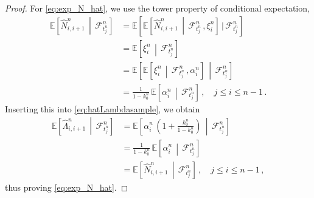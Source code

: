 \documentclass{article}
\newcommand{\1}{\mathbbm{1}}
\numberwithin{equation}{section}
\begin{document}
\begin{proof}
    For \eqref{eq:exp_N_hat}, we use the tower property of conditional expectation,
    \begin{align}
    \label{eq:conditional_exp_N_alpha}
        \mathbb E \left[\widehat N^n_{i,i+1}\,\middle|\,\mathcal F^n_{t^n_j} \right] &= \mathbb E \left[\mathbb E \left[\widehat N^n_{i,i+1}\,\middle|\,\mathcal F^n_{t^n_j}\,, \xi^n_i \right]\,|\,\mathcal F^n_{t^n_j} \right] \nonumber\\
        &= \mathbb E \left[\xi^n_i\,\middle|\,\mathcal F^n_{t^n_j}\right] \nonumber\\
        &= \mathbb E \left[ \mathbb E \left[ \xi^n_i\,\middle|\,\mathcal F^n_{t^n_j}\,, \alpha^n_i\right]\,\middle|\,\mathcal F^n_{t^n_j}\right] \nonumber\\
        &= \frac{1}{1 - k_0^n}\,\mathbb E \left[\alpha^n_i\,\middle|\,\mathcal F^n_{t^n_j} \right]\,,\quad j \leq i \leq n-1\,.
    \end{align}
    Inserting this into \eqref{eq:hatLambdasample}, we obtain
    \begin{align*}
        \mathbb E \left[\widehat \Lambda^n_{i,i+1}\,\middle |\,\mathcal F^n_{t^n_j} \right] &= \mathbb E \left[\alpha^n_i\,\left(1 + \frac{k_0^n}{1 - k_0^n} \right)\,\middle |\, \mathcal F^n_{t^n_j} \right] \\
        &= \frac{1}{1 - k_0^n}\, \mathbb E \left[\alpha^n_i\,\middle |\,\mathcal F^n_{t^n_j} \right] \\
        &= \mathbb E \left[\widehat N^n_{i,i+1}\,\middle |\,\mathcal F^n_{t^n_j} \right]\,, \quad j \leq i \leq n-1\,,
    \end{align*}
    thus proving \eqref{eq:exp_N_hat}.


\end{proof}
\end{document}
